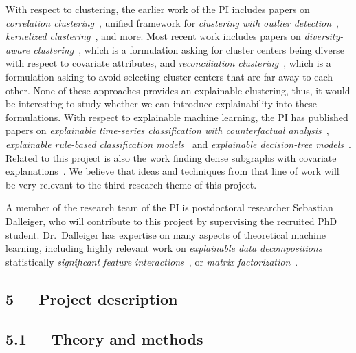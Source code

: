 \documentclass[a4paper,11pt]{article}
\begin{document}
With respect to clustering, 
the earlier work of the PI includes papers on
\emph{correlation clustering}~\cite{bonchi2013overlapping,gionis2007clustering},
unified framework for \emph{clustering with outlier detection}~\cite{chawla2013k},
\emph{kernelized clustering}~\cite{amid2015kernel}, and more.
Most recent work includes papers on
\emph{diversity-aware clustering}~\cite{thejaswi2021diversity}, 
which is a formulation asking for cluster centers being diverse with respect to covariate attributes, and
\emph{reconciliation clustering}~\cite{spoerhase2023constant}, 
which is a formulation asking to avoid selecting cluster centers that are far away to each other.
None of these approaches provides an explainable clustering, 
thus, it would be interesting to study whether we can introduce explainability
into these formulations.
%
With respect to explainable machine learning, 
the PI has published papers on 
\emph{explainable time-series classification with counterfactual analysis}~\cite{karlsson2020locally},
\emph{explainable rule-based classification models}~\cite{ciaperoni2023concise,zhang2020diverse}
and 
\emph{explainable decision-tree models}~\cite{zhang2023regularized}. 
Related to this project is also the work
finding dense subgraphs with covariate explanations~\cite{galbrun2014overlapping}.
We believe that ideas and techniques from that line of work
will be very relevant to the third research theme of this project.

A member of the research team of the PI is postdoctoral researcher Sebastian Dalleiger, 
who will contribute to this project by supervising the recruited PhD student.
Dr.\ Dalleiger has expertise on many aspects of theoretical machine learning, 
including highly relevant work on \emph{explainable data decompositions}~\cite{dalleiger2020explainable}
statistically \emph{significant feature interactions}~\cite{dalleiger2022spass}, 
or \emph{matrix factorization}~\cite{dalleiger2022efficiently}.

\subsection*{5~~~Project description}


\subsection*{5.1~~~Theory and methods}
\end{document}

